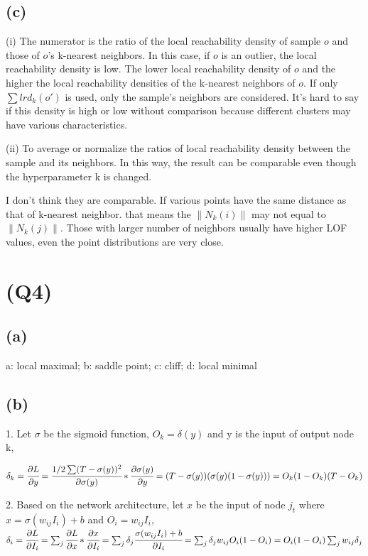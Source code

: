 \documentclass[]{article}
\begin{document}
\subsection*{(c)}
(i) The numerator is the ratio of the local reachability density of sample $o$ and those of $o$'s k-nearest neighbors. In this case, if $o$ is an outlier, the local reachability density is low. 
The lower local reachability density of $o$ and the higher the local reachability densities of the k-nearest neighbors of $o$. 
If only $\sum lrd_k(o')$ is used, only the sample's neighbors are considered. It's hard to say if this density is high or low without comparison because different clusters may have various characteristics. 

(ii) To average or normalize the ratios of local reachability density between the sample and its neighbors. In this way, the result can be comparable even though the hyperparameter k is changed. 

I don't think they are comparable. If various points have the same distance as that of k-nearest neighbor. that means the $\|N_k(i)\|$ may not equal to $\|N_k(j)\|$. Those with larger number of neighbors usually have higher LOF values, even the point distributions are very close. 

\newpage
\section*{(Q4)}
\subsection*{(a)}
a: local maximal; b: saddle point; c: cliff; d: local minimal 

\subsection*{(b)}
1. Let $\sigma$ be the sigmoid function, $O_k=\delta(y)$ and y is the input of output node k,

$\delta_k=\cfrac{\partial L}{\partial y}
=\cfrac{1/2\sum(T-\sigma(y))^2}{\partial\sigma(y)}*\cfrac{\partial \sigma(y)}{\partial y}=(T-\sigma(y))(\sigma(y)(1-\sigma(y)))=O_k(1-O_k)(T-O_k)$

2. Based on the network architecture, let $x$ be the input of node $j_t$ where $x=\sigma(w_{ij} I_i)+b$ and $O_i=w_{ij} I_i$, \\
$\delta_i= \cfrac{\partial L}{\partial I_i}=\sum_j \cfrac{\partial L}{\partial x}*\cfrac{\partial x}{\partial I_i}=\sum_j \delta_j \cfrac{\sigma(w_{ij} I_i)+b}{\partial I_i}=\sum_j \delta_j w_{ij} O_i(1-O_i)=O_i(1-O_i)\sum_jw_{ij}\delta_j$
\end{document}

